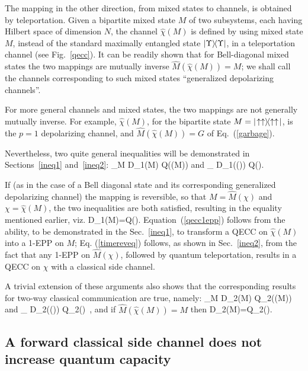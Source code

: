 The mapping in the other direction, from
mixed states to channels, is obtained by teleportation.  Given a
bipartite mixed state $M$ of two subsystems, each having Hilbert space
of dimension $N$, the channel $\hat{\chi}(M)$ is defined by using mixed
state $M$, instead of the standard maximally entangled state
$| \Upsilon \rangle\! \langle \Upsilon |$, in a teleportation~\cite{teleportation} 
channel (see Fig.~\ref{qecc}).  It can be readily 
shown that for Bell-diagonal mixed states the two mappings are mutually
inverse $\hat{M}(\hat{\chi}(M))=M$; we shall call the channels
corresponding to such mixed states ``generalized depolarizing
channels''.
 
For more general channels and mixed states, the two mappings are not
generally mutually inverse.  For example, $\hat{\chi}(M)$, for
the bipartite state $M=| \!\uparrow\uparrow \rangle\!\langle \uparrow\uparrow\! |$, 
is the $p=1$ depolarizing channel, and $\hat{M}(\hat{\chi}(M))=G$ of
Eq.~(\ref{garbage}).
 
Nevertheless, two quite general inequalities will be demonstrated in
Sections~\ref{ineq1} and~\ref{ineq2}:
\beq
\forall_M  \;\;\; D_1(M) \geq Q(\hat{\chi}(M))
\label{qecc1epp}\eeq
and
\beq
\forall_{\chi} \;\;\; D_1((\chi)) \leq Q(\chi).
\label{timereveq}\eeq
 
If (as in the case of a Bell diagonal state and its corresponding
generalized depolarizing channel) the mapping is reversible,
so that $ M=\hat{M}(\chi)$ and $\chi=\hat{\chi}(M)$, the two inequalities
are both satisfied, resulting in the equality mentioned earlier, viz.
 \beq
D_1(M)=Q(\chi).
\label{bigeq}
 \eeq
Equation~(\ref{qecc1epp}) follows from the ability, to be demonstrated
in the Sec.~\ref{ineq1}, to transform a QECC on
$\hat{\chi}(M)$ into a 1-EPP on $M$; Eq. (\ref{timereveq}) follows, as
shown in Sec.~\ref{ineq2}, from the fact that any 1-EPP on $\hat{M}(\chi)$,
followed by quantum teleportation, results in a QECC on $\chi$ 
with a classical side channel.
 
A trivial extension of these arguments also shows that the corresponding
results for two-way classical communication are true, namely:
\beq
\forall_M  \;\;\; D_2(M) \geq Q_2(\hat{\chi}(M))
\eeq
and
\beq
\forall_{\chi} \;\;\; D_2((\chi)) \leq Q_2(\chi)\ ,
\eeq
and if $\hat{M}(\hat{\chi}(M))=M$ then
\beq
D_2(M)=Q_2(\chi).
\eeq
 
 
\subsection{A forward classical side channel does not increase
quantum capacity}
\label{decodeproof}

